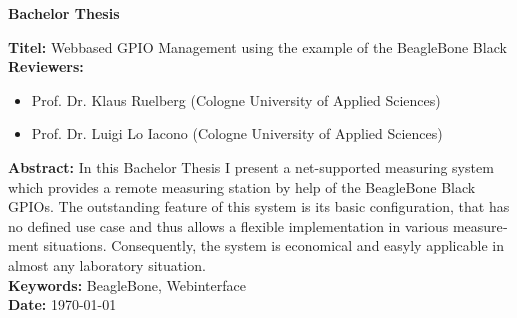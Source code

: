 \begin{otherlanguage}{english}

\begin{center}
	\textbf{Bachelor Thesis}
\end{center}

\noindent \textbf{Titel:} Webbased GPIO Management using the example of the BeagleBone Black\\

\noindent \textbf{Reviewers:}
\begin{itemize}
	\item Prof. Dr. Klaus Ruelberg (Cologne University of Applied Sciences)
	\item Prof. Dr. Luigi Lo Iacono (Cologne University of Applied Sciences)
\end{itemize}

\noindent \textbf{Abstract:} In this Bachelor Thesis I present a net-supported measuring system which provides a remote measuring station by help of the BeagleBone Black GPIOs. The outstanding feature of this system is its basic configuration, that has no defined use case and thus allows a flexible implementation in various measurement situations. Consequently, the system is economical and easyly applicable in almost any laboratory situation.\\

\noindent \textbf{Keywords:} BeagleBone, Webinterface\\

\noindent \textbf{Date:} {\longdate \today}

\end{otherlanguage}